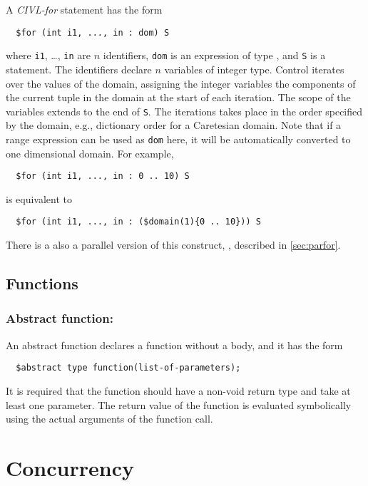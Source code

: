 A \emph{CIVL-for} statement has the form
\begin{verbatim}
  $for (int i1, ..., in : dom) S
\end{verbatim}
where \texttt{i1}, \ldots, \texttt{in} are $n$ identifiers,
\texttt{dom} is an expression of type , and
\texttt{S} is a statement.  The identifiers declare $n$ variables of
integer type.  Control iterates over the values of the domain,
assigning the integer variables the components of the current tuple in
the domain at the start of each iteration.  The scope of the variables
extends to the end of \texttt{S}.  The iterations takes place in the
order specified by the domain, e.g., dictionary order for a Caretesian
domain. Note that if a range expression can be used as \texttt{dom} here, it will be 
automatically converted to one dimensional domain. For example, 
 \begin{verbatim}
  $for (int i1, ..., in : 0 .. 10) S
\end{verbatim}
is equivalent to
\begin{verbatim}
  $for (int i1, ..., in : ($domain(1){0 .. 10})) S
\end{verbatim}

There is a also a parallel version of this construct, \cparfor,
described in \ref{sec:parfor}.

\section{Functions}
\subsection{Abstract function: \cabstract}

An abstract function declares a function without a body, and it has the form 

\begin{verbatim}
  $abstract type function(list-of-parameters);
\end{verbatim}

It is required that the function should have a non-void return type and take at least one parameter.
The return value of the function is evaluated symbolically using the actual arguments of the function call.

\chapter{Concurrency}
\label{chap:concurrency}

